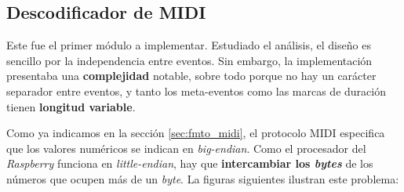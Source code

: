 \subsection{Descodificador de MIDI}

Este fue el primer módulo a implementar. Estudiado el análisis, el diseño es sencillo por la independencia entre eventos. Sin embargo, la implementación presentaba una \textbf{complejidad} notable, sobre todo porque no hay un carácter separador entre eventos, y tanto los meta-eventos como las marcas de duración tienen \textbf{longitud variable}.

Como ya indicamos en la sección \ref{sec:fmto_midi}, el protocolo \acrshort{MIDI} especifica que los valores numéricos se indican en \textit{big-endian}. Como el procesador del \textit{Raspberry} funciona en \textit{little-endian}, hay que \textbf{intercambiar los \textit{bytes}} de los números que ocupen más de un \textit{byte}. La figuras siguientes ilustran este problema:

\smallskip

